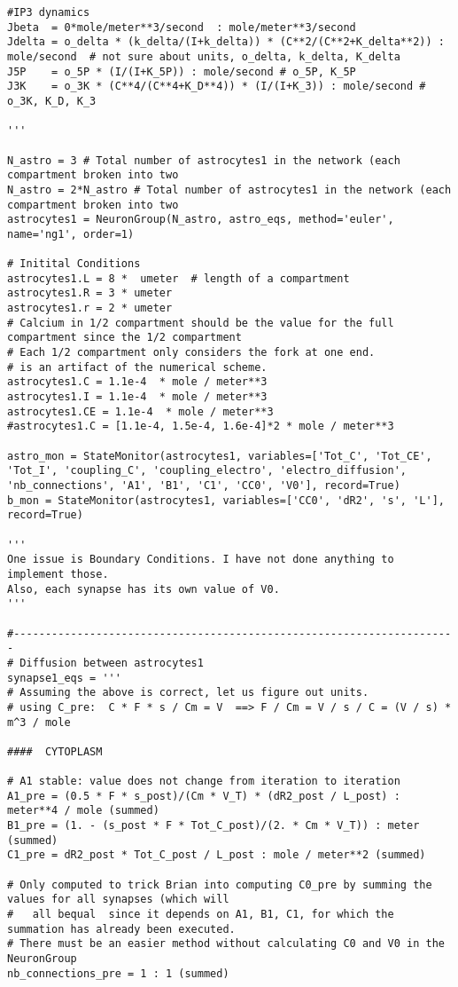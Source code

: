 \documentclass{article}
\begin{document}
\begin{verbatim}
#IP3 dynamics
Jbeta  = 0*mole/meter**3/second  : mole/meter**3/second
Jdelta = o_delta * (k_delta/(I+k_delta)) * (C**2/(C**2+K_delta**2)) : mole/second  # not sure about units, o_delta, k_delta, K_delta
J5P    = o_5P * (I/(I+K_5P)) : mole/second # o_5P, K_5P
J3K    = o_3K * (C**4/(C**4+K_D**4)) * (I/(I+K_3)) : mole/second # o_3K, K_D, K_3

'''

N_astro = 3 # Total number of astrocytes1 in the network (each compartment broken into two
N_astro = 2*N_astro # Total number of astrocytes1 in the network (each compartment broken into two
astrocytes1 = NeuronGroup(N_astro, astro_eqs, method='euler', name='ng1', order=1)

# Initital Conditions
astrocytes1.L = 8 *  umeter  # length of a compartment
astrocytes1.R = 3 * umeter
astrocytes1.r = 2 * umeter
# Calcium in 1/2 compartment should be the value for the full compartment since the 1/2 compartment
# Each 1/2 compartment only considers the fork at one end. 
# is an artifact of the numerical scheme.
astrocytes1.C = 1.1e-4  * mole / meter**3
astrocytes1.I = 1.1e-4  * mole / meter**3
astrocytes1.CE = 1.1e-4  * mole / meter**3
#astrocytes1.C = [1.1e-4, 1.5e-4, 1.6e-4]*2 * mole / meter**3

astro_mon = StateMonitor(astrocytes1, variables=['Tot_C', 'Tot_CE', 'Tot_I', 'coupling_C', 'coupling_electro', 'electro_diffusion', 'nb_connections', 'A1', 'B1', 'C1', 'CC0', 'V0'], record=True)
b_mon = StateMonitor(astrocytes1, variables=['CC0', 'dR2', 's', 'L'], record=True)

'''
One issue is Boundary Conditions. I have not done anything to implement those. 
Also, each synapse has its own value of V0. 
'''

#----------------------------------------------------------------------
# Diffusion between astrocytes1
synapse1_eqs = '''
# Assuming the above is correct, let us figure out units. 
# using C_pre:  C * F * s / Cm = V  ==> F / Cm = V / s / C = (V / s) * m^3 / mole

####  CYTOPLASM

# A1 stable: value does not change from iteration to iteration
A1_pre = (0.5 * F * s_post)/(Cm * V_T) * (dR2_post / L_post) : meter**4 / mole (summed)
B1_pre = (1. - (s_post * F * Tot_C_post)/(2. * Cm * V_T)) : meter (summed)
C1_pre = dR2_post * Tot_C_post / L_post : mole / meter**2 (summed)

# Only computed to trick Brian into computing C0_pre by summing the values for all synapses (which will 
#   all bequal  since it depends on A1, B1, C1, for which the summation has already been executed. 
# There must be an easier method without calculating C0 and V0 in the NeuronGroup
nb_connections_pre = 1 : 1 (summed)


\end{verbatim}
\end{document}
